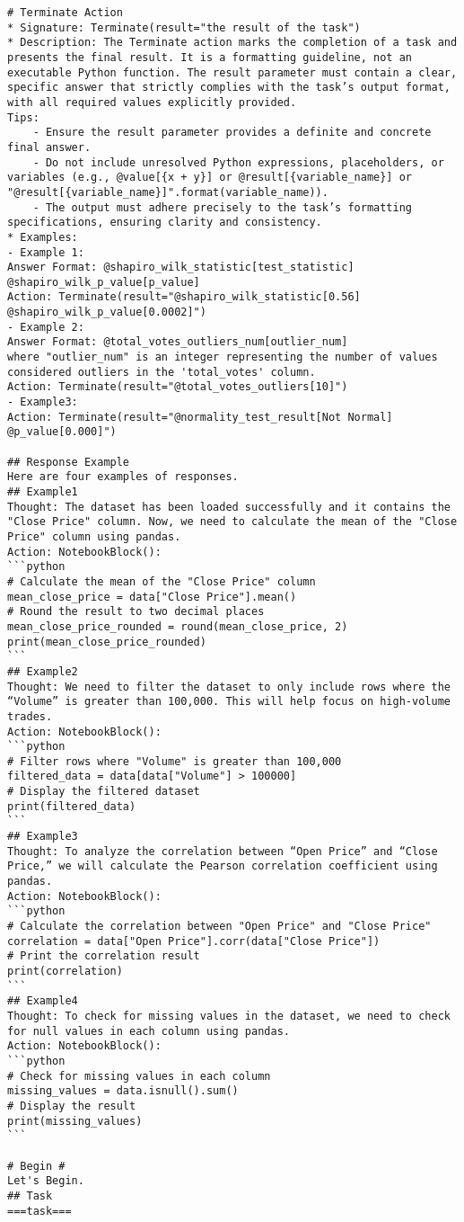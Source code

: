 \begin{tcolorbox}[title=Prompt on DABench, breakable, width=\textwidth,top=0mm]
\begin{Verbatim}[breaklines, fontsize=\footnotesize]
# Terminate Action
* Signature: Terminate(result="the result of the task")
* Description: The Terminate action marks the completion of a task and presents the final result. It is a formatting guideline, not an executable Python function. The result parameter must contain a clear, specific answer that strictly complies with the task’s output format, with all required values explicitly provided.
Tips:
    - Ensure the result parameter provides a definite and concrete final answer.
    - Do not include unresolved Python expressions, placeholders, or variables (e.g., @value[{x + y}] or @result[{variable_name}] or "@result[{variable_name}]".format(variable_name)).
    - The output must adhere precisely to the task’s formatting specifications, ensuring clarity and consistency.
* Examples:
- Example 1: 
Answer Format: @shapiro_wilk_statistic[test_statistic] @shapiro_wilk_p_value[p_value]
Action: Terminate(result="@shapiro_wilk_statistic[0.56] @shapiro_wilk_p_value[0.0002]")
- Example 2: 
Answer Format: @total_votes_outliers_num[outlier_num]
where "outlier_num" is an integer representing the number of values considered outliers in the 'total_votes' column.
Action: Terminate(result="@total_votes_outliers[10]")
- Example3:
Action: Terminate(result="@normality_test_result[Not Normal] @p_value[0.000]")

## Response Example
Here are four examples of responses.
## Example1
Thought: The dataset has been loaded successfully and it contains the "Close Price" column. Now, we need to calculate the mean of the "Close Price" column using pandas.
Action: NotebookBlock():
```python
# Calculate the mean of the "Close Price" column
mean_close_price = data["Close Price"].mean()
# Round the result to two decimal places
mean_close_price_rounded = round(mean_close_price, 2)
print(mean_close_price_rounded)
```
## Example2
Thought: We need to filter the dataset to only include rows where the “Volume” is greater than 100,000. This will help focus on high-volume trades.
Action: NotebookBlock():
```python
# Filter rows where "Volume" is greater than 100,000
filtered_data = data[data["Volume"] > 100000]
# Display the filtered dataset
print(filtered_data)
```
## Example3
Thought: To analyze the correlation between “Open Price” and “Close Price,” we will calculate the Pearson correlation coefficient using pandas.
Action: NotebookBlock():
```python
# Calculate the correlation between "Open Price" and "Close Price"
correlation = data["Open Price"].corr(data["Close Price"])
# Print the correlation result
print(correlation)
```
## Example4
Thought: To check for missing values in the dataset, we need to check for null values in each column using pandas.
Action: NotebookBlock():
```python
# Check for missing values in each column
missing_values = data.isnull().sum()
# Display the result
print(missing_values)
```

# Begin #
Let's Begin.
## Task 
===task===
\end{Verbatim}
\end{tcolorbox}


